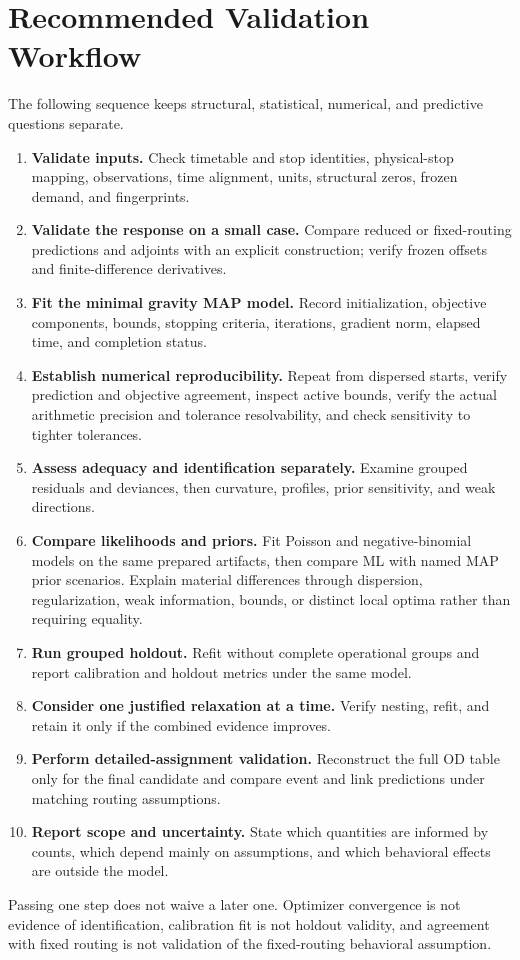 
\section{Recommended Validation Workflow}
\label{sec:recommended-validation-workflow}

The following sequence keeps structural, statistical, numerical, and
predictive questions separate.
\begin{enumerate}
  \item \textbf{Validate inputs.} Check timetable and stop identities,
        physical-stop mapping, observations, time alignment, units, structural
        zeros, frozen demand, and fingerprints.
  \item \textbf{Validate the response on a small case.} Compare reduced or
        fixed-routing predictions and adjoints with an explicit construction;
        verify frozen offsets and finite-difference derivatives.
  \item \textbf{Fit the minimal gravity MAP model.} Record initialization,
        objective components, bounds, stopping criteria, iterations, gradient
        norm, elapsed time, and completion status.
  \item \textbf{Establish numerical reproducibility.} Repeat from dispersed
        starts, verify prediction and objective agreement, inspect active
        bounds, verify the actual arithmetic precision and tolerance
        resolvability, and check sensitivity to tighter tolerances.
  \item \textbf{Assess adequacy and identification separately.} Examine
        grouped residuals and deviances, then curvature, profiles, prior
        sensitivity, and weak directions.
  \item \textbf{Compare likelihoods and priors.} Fit Poisson and
        negative-binomial models on the same prepared artifacts, then compare
        ML with named MAP prior scenarios. Explain material differences through
        dispersion, regularization, weak information, bounds, or distinct
        local optima rather than requiring equality.
  \item \textbf{Run grouped holdout.} Refit without complete operational groups
        and report calibration and holdout metrics under the same model.
  \item \textbf{Consider one justified relaxation at a time.} Verify nesting,
        refit, and retain it only if the combined evidence improves.
  \item \textbf{Perform detailed-assignment validation.} Reconstruct the full
        OD table only for the final candidate and compare event and link
        predictions under matching routing assumptions.
  \item \textbf{Report scope and uncertainty.} State which quantities are
        informed by counts, which depend mainly on assumptions, and which
        behavioral effects are outside the model.
\end{enumerate}

Passing one step does not waive a later one. Optimizer convergence is not
evidence of identification, calibration fit is not holdout validity, and
agreement with fixed routing is not validation of the fixed-routing behavioral
assumption.
